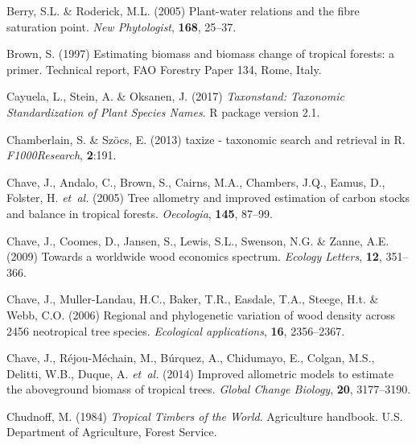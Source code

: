 \documentclass[a4paper, 12pt, leqno, dvipsnames]{article}\usepackage[]{graphicx}\usepackage[]{color}
\begin{document}
\begin{thebibliography}{50}
Berry, S.L. \& Roderick, M.L. (2005) Plant-water relations and the fibre
  saturation point.
\newblock \emph{New Phytologist}, \textbf{168}, 25--37.

Brown, S. (1997) Estimating biomass and biomass change of tropical forests: a
  primer.
\newblock Technical report, FAO Forestry Paper 134, Rome, Italy.

Cayuela, L., Stein, A. \& Oksanen, J. (2017) \emph{Taxonstand: Taxonomic
  Standardization of Plant Species Names}.
\newblock R package version 2.1.

Chamberlain, S. \& Sz\"ocs, E. (2013) taxize - taxonomic search and retrieval in
  {R}.
\newblock \emph{F1000Research}, \textbf{2}:191.

Chave, J., Andalo, C., Brown, S., Cairns, M.A., Chambers, J.Q., Eamus, D.,
  Folster, H. \emph{et~al.} (2005) Tree allometry and
  improved estimation of carbon stocks and balance in tropical forests.
\newblock \emph{Oecologia}, \textbf{145}, 87--99.

Chave, J., Coomes, D., Jansen, S., Lewis, S.L., Swenson, N.G. \& Zanne, A.E.
  (2009) Towards a worldwide wood economics spectrum.
\newblock \emph{Ecology Letters}, \textbf{12}, 351--366.

Chave, J., Muller-Landau, H.C., Baker, T.R., Easdale, T.A., Steege, H.t. \&
  Webb, C.O. (2006) Regional and phylogenetic variation of wood density across
  2456 neotropical tree species.
\newblock \emph{Ecological applications}, \textbf{16}, 2356--2367.

Chave, J., Réjou-Méchain, M., Búrquez, A., Chidumayo, E., Colgan, M.S.,
  Delitti, W.B., Duque, A. \emph{et~al.} (2014)
  Improved allometric models to estimate the aboveground biomass of tropical
  trees.
\newblock \emph{Global Change Biology}, \textbf{20}, 3177--3190.

Chudnoff, M. (1984) \emph{Tropical Timbers of the World}.
\newblock Agriculture handbook. U.S. Department of Agriculture, Forest Service.


\end{thebibliography}
\end{document}
